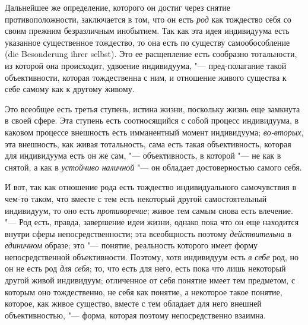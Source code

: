 Дальнейшее же определение, которого он достиг через снятие
противоположности, заключается в том, что он есть
{\em род} как тождество
себя со своим прежним безразличным инобытием. Так как эта
идея индивидуума есть указанное существенное тождество, то она есть по
существу самообособление (die Besonderung ihrer selbst). Это
ее расщепление есть сообразно тотальности, из которой она происходит,
удвоение индивидуума, "--- пред-полагание такой объективности,
которая тождественна с ним, и отношение живого существа к себе самому как к
другому живому.

Это всеобщее есть третья ступень, истина жизни, поскольку
жизнь еще замкнута в своей сфере. Эта ступень есть соотносящийся с собой
процесс индивидуума, в каковом процессе внешность есть имманентный момент
индивидуума; {\em во-вторых},
эта внешность, как живая тотальность, сама есть такая
объективность, которая для индивидуума есть он же сам, "---
объективность, в которой "--- не как в снятой, а
как в {\em устойчиво наличной}
"--- он обладает достоверностью самого себя.

И вот, так как отношение рода есть тождество индивидуального
самочувствия в чем-то таком, что вместе с тем есть некоторый другой
самостоятельный индивидуум, то оно есть
{\em противоречие}; живое
тем самым снова есть влечение. "--- Род есть, правда,
завершение идеи жизни, однако пока что он еще находится внутри сферы
непосредственности; эта всеобщность поэтому
{\em действительна} в
{\em единичном} образе;
это "--- понятие, реальность которого имеет форму
непосредственной объективности. Поэтому, хотя индивидуум есть
{\em в себе} род, но он
не есть род {\em для себя};
то, что есть для него, есть пока что лишь некоторый другой
живой индивидуум; отличенное от себя понятие имеет тем предметом, с которым
оно тождественно, не себя как понятие, а некоторое такое понятие, которое,
как живое существо, вместе с тем обладает для него внешней объективностью,
"--- форма, которая поэтому непосредственно взаимна.

